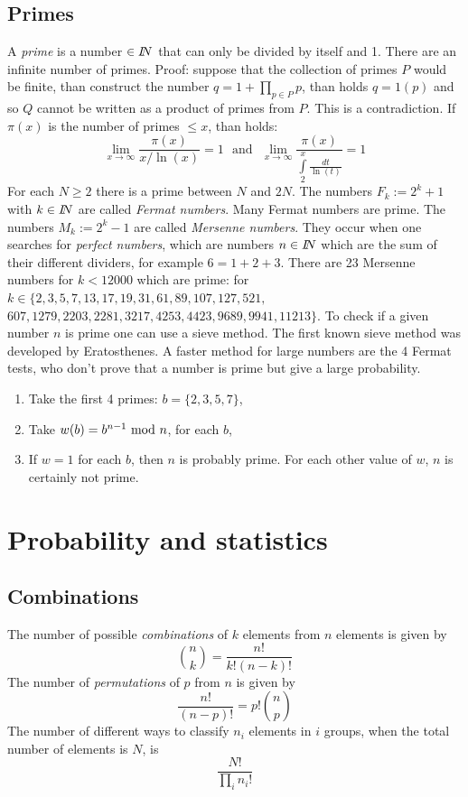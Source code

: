 \documentclass[twoside]{report}
\begin{document}
\section{Primes}
A {\it prime} is a number $\in I\hspace{-1mm}N$ that can only be divided by itself and
1. There are an infinite number of primes. Proof: suppose that the collection of primes
$P$ would be finite, than construct the number $q=1+\prod\limits_{p\in P}p$,
than holds $q=1(p)$ and so $Q$ cannot be written as a product of primes from
$P$. This is a contradiction.
\npar
If $\pi(x)$ is the number of primes $\leq x$, than holds:
\[
\lim_{x\rightarrow\infty}\frac{\pi(x)}{x/\ln(x)}=1~~~\mbox{and}~~~
\lim_{x\rightarrow\infty}\frac{\pi(x)}{\int\limits_2^x\frac{dt}{\ln(t)}}=1
\]
For each $N\geq2$ there is a prime between $N$ and $2N$.
\npar
The numbers $F_k:=2^k+1$ with $k\in I\hspace{-1mm}N$ are called {\it Fermat numbers}.
Many Fermat numbers are prime.
\npar
The numbers $M_k:=2^k-1$ are called {\it Mersenne numbers}. They occur when
one searches for {\it perfect numbers}, which are numbers $n\in I\hspace{-1mm}N$ which are
the sum of their different dividers, for example $6=1+2+3$. There are 23
Mersenne numbers for $k<12000$ which are prime:
for $k\in\{2,3,5,7,13,17,19,31,61,89,107,127,521,$
$607,1279,2203,2281,3217,4253,4423,9689,9941,11213\}$.
\npar
To check if a given number $n$ is prime one can use a sieve method. The
first known sieve method was developed by Eratosthenes. A faster method for
large numbers are the 4 Fermat tests, who don't prove that a number is prime
but give a large probability.
\begin{enumerate}
\item Take the first 4 primes: $b=\{2,3,5,7\}$,
\item Take $w(b)=b^{n-1}~{\rm mod}~n$, for each $b$,
\item If $w=1$ for each $b$, then $n$ is probably prime. For each other value
      of $w$, $n$ is certainly not prime.
\end{enumerate}


\chapter{Probability and statistics}
\section{Combinations}
The number of possible {\it combinations} of $k$ elements from $n$ elements is
given by
\[
{n\choose k}=\frac{n!}{k!(n-k)!}
\]
The number of {\it permutations} of $p$ from $n$ is given by
\[
\frac{n!}{(n-p)!}=p!{n\choose p}
\]
The number of different ways to classify $n_i$ elements in $i$ groups, when
the total number of elements is $N$, is
\[
\frac{N!}{\prod\limits_i n_i!}
\]
\end{document}
